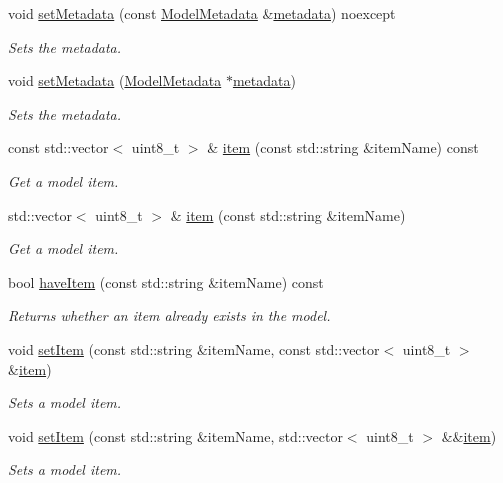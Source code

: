 \begin{DoxyCompactItemize}
void \hyperlink{group___classification_module_ga240a62f23ad36c3eac6b7c91d90708d7}{set\+Metadata} (const \hyperlink{classdg_1_1deepcore_1_1classification_1_1_model_metadata}{Model\+Metadata} \&\hyperlink{group___classification_module_gaa88957807aa9cd63108033b376e60ef2}{metadata}) noexcept
\begin{DoxyCompactList}\small\item\em Sets the metadata. \end{DoxyCompactList}\item 
void \hyperlink{group___classification_module_ga24a23bab6f1de6810b2b38c67b8eac78}{set\+Metadata} (\hyperlink{classdg_1_1deepcore_1_1classification_1_1_model_metadata}{Model\+Metadata} $\ast$\hyperlink{group___classification_module_gaa88957807aa9cd63108033b376e60ef2}{metadata})
\begin{DoxyCompactList}\small\item\em Sets the metadata. \end{DoxyCompactList}\item 
const std\+::vector$<$ uint8\+\_\+t $>$ \& \hyperlink{group___classification_module_ga897ce1fbc0efb85360a6cc5ab958209d}{item} (const std\+::string \&item\+Name) const 
\begin{DoxyCompactList}\small\item\em Get a model item. \end{DoxyCompactList}\item 
std\+::vector$<$ uint8\+\_\+t $>$ \& \hyperlink{group___classification_module_ga8a80cf25a3e493dcbb32c6fcdfc1807b}{item} (const std\+::string \&item\+Name)
\begin{DoxyCompactList}\small\item\em Get a model item. \end{DoxyCompactList}\item 
bool \hyperlink{group___classification_module_gad0a0e3e9762e66bbd6b03d70011df25e}{have\+Item} (const std\+::string \&item\+Name) const 
\begin{DoxyCompactList}\small\item\em Returns whether an item already exists in the model. \end{DoxyCompactList}\item 
void \hyperlink{group___classification_module_ga8f03404f9b535950e5686b4003b20280}{set\+Item} (const std\+::string \&item\+Name, const std\+::vector$<$ uint8\+\_\+t $>$ \&\hyperlink{group___classification_module_ga897ce1fbc0efb85360a6cc5ab958209d}{item})
\begin{DoxyCompactList}\small\item\em Sets a model item. \end{DoxyCompactList}\item 
void \hyperlink{group___classification_module_ga17cdbbe5928308eb299844f4df1455ad}{set\+Item} (const std\+::string \&item\+Name, std\+::vector$<$ uint8\+\_\+t $>$ \&\&\hyperlink{group___classification_module_ga897ce1fbc0efb85360a6cc5ab958209d}{item})
\begin{DoxyCompactList}\small\item\em Sets a model item. \end{DoxyCompactList}\end{DoxyCompactItemize}
